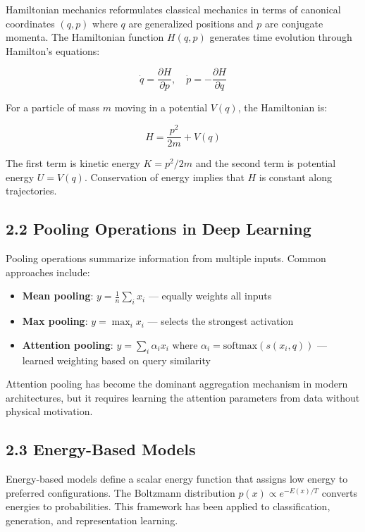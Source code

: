 \documentclass[12pt]{article}
\begin{document}
Hamiltonian mechanics reformulates classical mechanics in terms of canonical coordinates $(q, p)$ where $q$ are generalized positions and $p$ are conjugate momenta. The Hamiltonian function $H(q, p)$ generates time evolution through Hamilton's equations:

\begin{equation}
\dot{q} = \frac{\partial H}{\partial p}, \quad \dot{p} = -\frac{\partial H}{\partial q}
\end{equation}

For a particle of mass $m$ moving in a potential $V(q)$, the Hamiltonian is:

\begin{equation}
H = \frac{p^2}{2m} + V(q)
\end{equation}

The first term is kinetic energy $K = p^2/2m$ and the second term is potential energy $U = V(q)$. Conservation of energy implies that $H$ is constant along trajectories.

\subsection{2.2 Pooling Operations in Deep Learning}

Pooling operations summarize information from multiple inputs. Common approaches include:

\begin{itemize}
\item \textbf{Mean pooling}: $y = \frac{1}{n} \sum_i x_i$ — equally weights all inputs
\item \textbf{Max pooling}: $y = \max_i x_i$ — selects the strongest activation
\item \textbf{Attention pooling}: $y = \sum_i \alpha_i x_i$ where $\alpha_i = \text{softmax}(s(x_i, q))$ — learned weighting based on query similarity
\end{itemize}

Attention pooling has become the dominant aggregation mechanism in modern architectures, but it requires learning the attention parameters from data without physical motivation.

\subsection{2.3 Energy-Based Models}

Energy-based models define a scalar energy function that assigns low energy to preferred configurations. The Boltzmann distribution $p(x) \propto e^{-E(x)/T}$ converts energies to probabilities. This framework has been applied to classification, generation, and representation learning.
\end{document}

